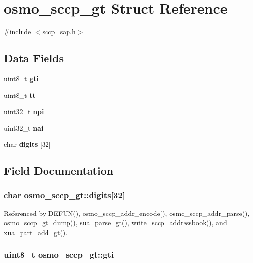 \section{osmo\+\_\+sccp\+\_\+gt Struct Reference}
\label{structosmo__sccp__gt}


{\ttfamily \#include $<$sccp\+\_\+sap.\+h$>$}

\subsection*{Data Fields}
\begin{DoxyCompactItemize}
\item 
uint8\+\_\+t {\bf gti}
\item 
uint8\+\_\+t {\bf tt}
\item 
uint32\+\_\+t {\bf npi}
\item 
uint32\+\_\+t {\bf nai}
\item 
char {\bf digits} [32]
\end{DoxyCompactItemize}


\subsection{Field Documentation}
\subsubsection[{digits}]{\setlength{\rightskip}{0pt plus 5cm}char osmo\+\_\+sccp\+\_\+gt\+::digits[32]}\label{structosmo__sccp__gt_ae743b1eaa2e0a149dda7a80c21483ed4}


Referenced by D\+E\+F\+U\+N(), osmo\+\_\+sccp\+\_\+addr\+\_\+encode(), osmo\+\_\+sccp\+\_\+addr\+\_\+parse(), osmo\+\_\+sccp\+\_\+gt\+\_\+dump(), sua\+\_\+parse\+\_\+gt(), write\+\_\+sccp\+\_\+addressbook(), and xua\+\_\+part\+\_\+add\+\_\+gt().

\subsubsection[{gti}]{\setlength{\rightskip}{0pt plus 5cm}uint8\+\_\+t osmo\+\_\+sccp\+\_\+gt\+::gti}\label{structosmo__sccp__gt_a15c958806a049ba12993188e9a1b7ca9}


